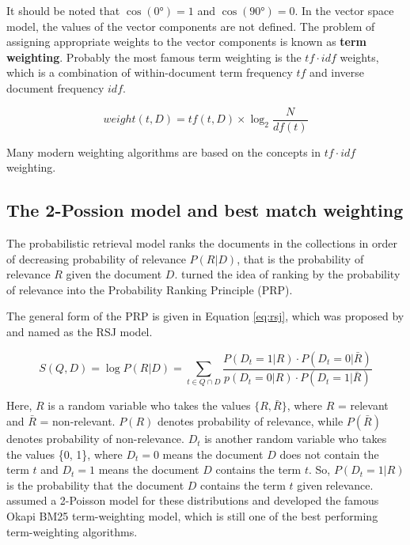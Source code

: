It should be noted that $\cos(0\si{\degree}) = 1$ and $\cos(90\si{\degree}) = 0$.
In the vector space model, the values of the vector components are not defined.
The problem of assigning appropriate weights to the vector components is known as \textbf{term weighting}.
Probably the most famous term weighting is the $tf\cdot idf$ weights, which is a combination of within-document term frequency $tf$ and inverse document frequency $idf$.


\begin{equation} \label{eq:tfidf}
weight(t,D) = tf(t, D) \times \log _2 \frac{N}{df(t)}
\end{equation}

Many modern weighting algorithms are based on the concepts in $tf\cdot idf$ weighting.

\subsection{The 2-Possion model and best match weighting}

The probabilistic retrieval model ranks the documents in the collections in order of decreasing probability of relevance $P(R|D)$, that is the probability of relevance $R$ given the document $D$.
\citet{PRP} turned the idea of ranking by the probability of relevance into the Probability Ranking Principle (PRP).

The general form of the PRP is given in Equation \ref{eq:rsj}, which was proposed by \citet{RSJ} and named as the RSJ model.

\begin{equation} \label{eq:rsj}
S(Q,D) = \log P(R|D)  = \sum_{t \in Q \cap D} \frac{P(D_t=1 \vert R) \cdot P(D_t=0 \vert \bar{R})} {p(D_t=0 \vert R) \cdot P(D_t=1 \vert \bar{R})}
\end{equation}

Here, $R$ is a random variable who takes the values $\{R, \bar{R}\}$, where $R$ = relevant and $\bar{R}$ = non-relevant.
$P(R)$ denotes probability of relevance, while $P(\bar{R})$ denotes probability of non-relevance.
$D_t$ is another random variable who takes the values \{0, 1\}, where $D_t=0$ means the document $D$ does not contain the term $t$ and $D_t=1$ means the document $D$ contains the term $t$.
So, $P(D_t=1 \vert R)$ is the probability that the document $D$ contains the term $t$ given relevance.
\citet{2Poisson} assumed a 2-Poisson model for these distributions and developed the famous Okapi BM25 term-weighting model, which is still one of the best performing term-weighting algorithms.

